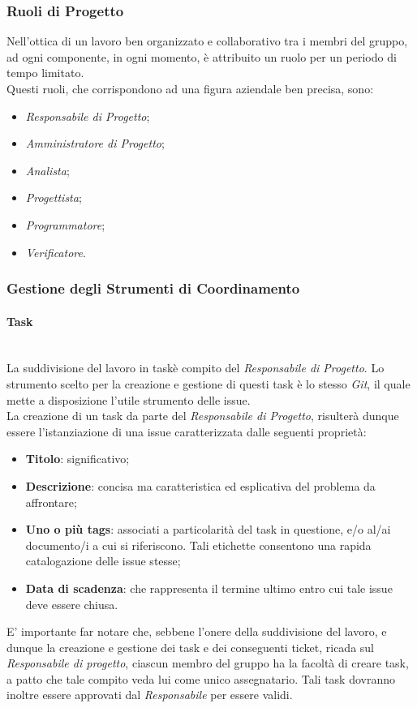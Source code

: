 \subsubsection{Ruoli di Progetto}\label{ProcessiOrganizzativi_RuoliProgetto}
Nell'ottica di un lavoro ben organizzato e collaborativo tra i membri del gruppo, ad ogni componente, in ogni momento, è attribuito un ruolo per un periodo di tempo limitato.\\
Questi ruoli, che corrispondono ad una figura aziendale ben precisa, sono:
\begin{itemize}
	\item \textit{Responsabile di Progetto};
	\item \textit{Amministratore di Progetto};
	\item \textit{Analista};
	\item \textit{Progettista};
	\item \textit{Programmatore};
	\item \textit{Verificatore}.
\end{itemize}


\subsubsection{Gestione degli Strumenti di Coordinamento}
\paragraph{Task} ~\\
La suddivisione del lavoro in task\glossario è compito del \textit{Responsabile di Progetto}. Lo strumento scelto per la creazione e gestione di questi task è lo stesso \textit{Git}\glossario, il quale mette a disposizione l'utile strumento delle issue.\\
La creazione di un task da parte del \textit{Responsabile di Progetto}, risulterà dunque essere l'istanziazione di una issue caratterizzata dalle seguenti proprietà:
\begin{itemize}
	\item \textbf{Titolo}: significativo;
	\item \textbf{Descrizione}: concisa ma caratteristica ed esplicativa del problema da affrontare;
	\item \textbf{Uno o più tags}: associati a particolarità del task in questione, e/o al/ai documento/i a cui si riferiscono. Tali etichette consentono una rapida catalogazione delle issue stesse;
	\item \textbf{Data di scadenza}: che rappresenta il termine ultimo entro cui tale issue deve essere chiusa.
\end{itemize}
E' importante far notare che, sebbene l'onere della suddivisione del lavoro, e dunque la creazione e gestione dei task e dei conseguenti ticket\glossario, ricada sul \textit{Responsabile di progetto}, ciascun membro del gruppo ha la facoltà di creare task, a patto che tale compito veda lui come unico assegnatario. Tali task dovranno inoltre essere approvati dal \textit{Responsabile} per essere validi.

